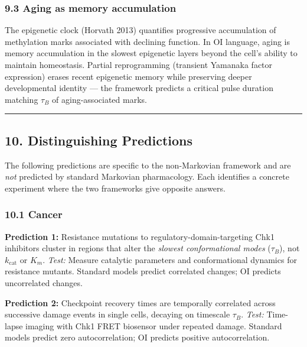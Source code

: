 \documentclass[
  11pt,
]{article}
\begin{document}
\hypertarget{aging-as-memory-accumulation}{%
\subsubsection{9.3 Aging as memory
accumulation}\label{aging-as-memory-accumulation}}

The epigenetic clock (Horvath 2013) quantifies progressive accumulation
of methylation marks associated with declining function. In OI language,
aging is memory accumulation in the slowest epigenetic layers beyond the
cell's ability to maintain homeostasis. Partial reprogramming (transient
Yamanaka factor expression) erases recent epigenetic memory while
preserving deeper developmental identity --- the framework predicts a
critical pulse duration matching \(\tau_B\) of aging-associated marks.

\begin{center}\rule{0.5\linewidth}{0.5pt}\end{center}

\hypertarget{distinguishing-predictions}{%
\subsection{10. Distinguishing
Predictions}\label{distinguishing-predictions}}

The following predictions are specific to the non-Markovian framework
and are \emph{not} predicted by standard Markovian pharmacology. Each
identifies a concrete experiment where the two frameworks give opposite
answers.

\hypertarget{cancer}{%
\subsubsection{10.1 Cancer}\label{cancer}}

\textbf{Prediction 1:} Resistance mutations to
regulatory-domain-targeting Chk1 inhibitors cluster in regions that
alter the \emph{slowest conformational modes} (\(\tau_B\)), not
\(k_{\text{cat}}\) or \(K_m\). \emph{Test:} Measure catalytic parameters
and conformational dynamics for resistance mutants. Standard models
predict correlated changes; OI predicts uncorrelated changes.

\textbf{Prediction 2:} Checkpoint recovery times are temporally
correlated across successive damage events in single cells, decaying on
timescale \(\tau_B\). \emph{Test:} Time-lapse imaging with Chk1 FRET
biosensor under repeated damage. Standard models predict zero
autocorrelation; OI predicts positive autocorrelation.
\end{document}
